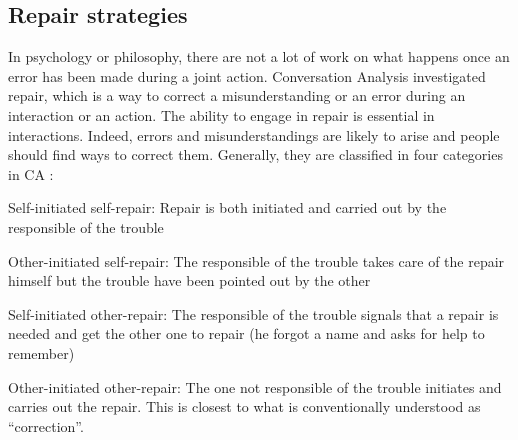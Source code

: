 \documentclass[a4paper,11pt,twoside]{StyleThese}
\begin{document}
\subsection{Repair strategies}
In psychology or philosophy, there are not a lot of work on what happens once an error has been made during a joint action. Conversation Analysis investigated repair, which is a way to correct a misunderstanding or an error during an interaction or an action. The ability to engage in repair is essential in interactions. Indeed, errors and misunderstandings are likely to arise and people should find ways to correct them. Generally, they are classified in four categories in CA \cite{schegloff_1977_preference,wooffitt_2008_conversation}:
\begin{bulletList}
	\item Self-initiated self-repair: Repair is both initiated and carried out by the responsible of the trouble
	\item Other-initiated self-repair: The responsible of the trouble takes care of the repair himself but the trouble have been pointed out by the other
	\item Self-initiated other-repair: The responsible of the trouble signals that a repair is needed and get the other one to repair (\eg he forgot a name and asks for help to remember)
	\item Other-initiated other-repair: The one not responsible of the trouble initiates and carries out the repair. This is closest to what is conventionally understood as ``correction''.
\end{bulletList}

\ifdefined{}
\else


\end{document}
